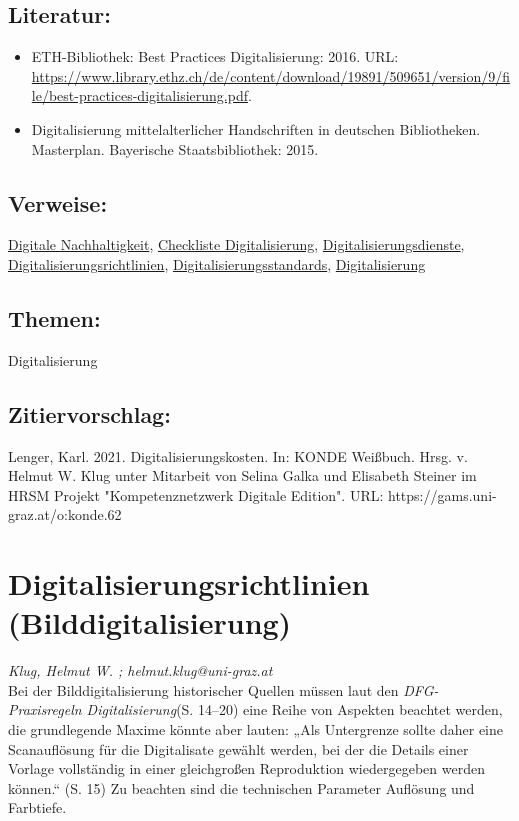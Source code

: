 \documentclass{article}
\begin{document}
        \subsection*{Literatur:}\begin{itemize}\item ETH-Bibliothek: Best Practices Digitalisierung: 2016. URL: \url{https://www.library.ethz.ch/de/content/download/19891/509651/version/9/file/best-practices-digitalisierung.pdf}.\item Digitalisierung mittelalterlicher Handschriften in
                              deutschen Bibliotheken. Masterplan. Bayerische Staatsbibliothek: 2015.\end{itemize}\subsection*{Verweise:}\href{https://gams.uni-graz.at/o:konde.6}{Digitale Nachhaltigkeit}, \href{https://gams.uni-graz.at/o:konde.40}{Checkliste Digitalisierung}, \href{https://gams.uni-graz.at/o:konde.61}{Digitalisierungsdienste}, \href{https://gams.uni-graz.at/o:konde.63}{Digitalisierungsrichtlinien}, \href{https://gams.uni-graz.at/o:konde.64}{Digitalisierungsstandards}, \href{https://gams.uni-graz.at/o:konde.60}{Digitalisierung}\subsection*{Themen:}Digitalisierung\subsection*{Zitiervorschlag:}Lenger, Karl. 2021. Digitalisierungskosten. In: KONDE Weißbuch. Hrsg. v. Helmut W. Klug unter Mitarbeit von Selina Galka und Elisabeth Steiner im HRSM Projekt "Kompetenznetzwerk Digitale Edition". URL: https://gams.uni-graz.at/o:konde.62\newpage\section*{Digitalisierungsrichtlinien (Bilddigitalisierung)} \emph{Klug, Helmut W. ; helmut.klug@uni-graz.at }\\
        
    Bei der Bilddigitalisierung historischer Quellen müssen laut den \emph{DFG-Praxisregeln Digitalisierung}(S. 14–20) eine Reihe von Aspekten beachtet werden, die grundlegende Maxime könnte aber lauten: „Als Untergrenze sollte daher eine Scanauflösung für die Digitalisate gewählt werden, bei der die Details einer Vorlage vollständig in einer gleichgroßen Reproduktion wiedergegeben werden können.“ (S. 15) Zu beachten sind die technischen Parameter Auflösung und Farbtiefe.\\
            
\end{document}
